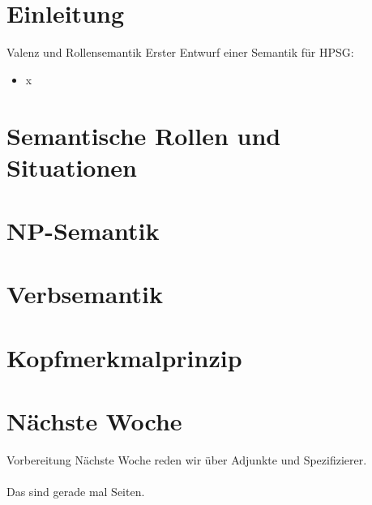\section{Einleitung}

\begin{frame}
  {Valenz und Rollensemantik}
  \onslide<+->
  \onslide<+->
  Erster Entwurf einer Semantik für HPSG:\\
  \Zeile
  \begin{itemize}[<+->]
    \item x
  \end{itemize}
  \Zeile
  \onslide<+->
  \centering 
\end{frame}

\section{Semantische Rollen und Situationen}

\section{NP-Semantik}

\section{Verbsemantik}

\section{Kopfmerkmalprinzip}

\section{Nächste Woche}

\begin{frame}
  {Vorbereitung}
  \onslide<+->
  \onslide<+->
  \centering 
  \large
  Nächste Woche reden wir über Adjunkte und Spezifizierer.\\
  \onslide<+->
  \Zeile
  \\
  \onslide<+->
  \Viertelzeile
  Das sind gerade mal  Seiten.
\end{frame}
